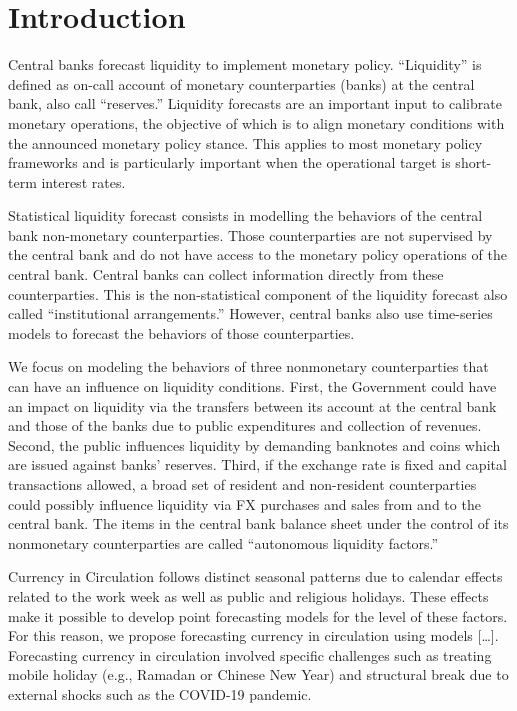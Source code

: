 \section{Introduction}
Central banks forecast liquidity to  implement monetary policy. “Liquidity” is
defined as on-call  account of monetary counterparties (banks)  at the central
bank,  also call  “reserves.” Liquidity  forecasts are  an important  input to
calibrate monetary  operations, the  objective of which  is to  align monetary
conditions with  the announced  monetary policy stance.  This applies  to most
monetary policy frameworks and is  particularly important when the operational
target is short-term interest rates.

Statistical  liquidity forecast  consists in  modelling the  behaviors of  the
central  bank  non-monetary  counterparties.   Those  counterparties  are  not
supervised by the central  bank and do not have access  to the monetary policy
operations of the central bank. Central banks can collect information directly
from  these  counterparties. This  is  the  non-statistical component  of  the
liquidity forecast also called “institutional arrangements.”  However, central
banks  also  use  time-series  models  to  forecast  the  behaviors  of  those
counterparties.

We focus  on modeling the  behaviors of three nonmonetary  counterparties that
can have  an influence  on liquidity conditions.  First, the  Government could
have  an impact  on liquidity  via the  transfers between  its account  at the
central bank and those of the  banks due to public expenditures and collection
of revenues.  Second, the public  influences liquidity by  demanding banknotes
and coins  which are issued  against banks’  reserves. Third, if  the exchange
rate is  fixed and capital transactions  allowed, a broad set  of resident and
non-resident  counterparties   could  possibly  influence  liquidity   via  FX
purchases and  sales from and  to the central bank.  The items in  the central
bank balance  sheet under  the control of  its nonmonetary  counterparties are
called “autonomous liquidity factors.”

Currency in  Circulation follows  distinct seasonal  patterns due  to calendar
effects  related   to  the  work  week   as  well  as  public   and  religious
holidays. These effects  make it possible to develop  point forecasting models
for  the level  of  these factors.  For this  reason,  we propose  forecasting
currency in circulation using models  […]. Forecasting currency in circulation
involved specific challenges such as treating mobile holiday (e.g., Ramadan or
Chinese New  Year) and  structural break  due to external  shocks such  as the
COVID-19 pandemic.

